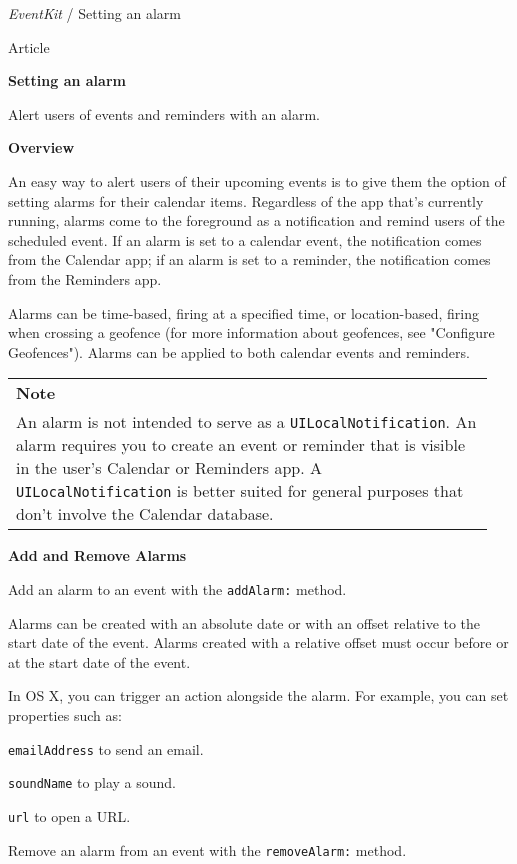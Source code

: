 \documentclass{article}
\title{}
\author{}
\date{}
\begin{document}
\noindent \textit{EventKit} / Setting an alarm

\noindent Article

\noindent \textbf{Setting an alarm}

\noindent Alert users of events and reminders with an alarm.

\noindent \textbf{Overview}

\noindent An easy way to alert users of their upcoming events is to give them the option of setting alarms for their calendar items. Regardless of the app that's currently running, alarms come to the foreground as a notification and remind users of the scheduled event. If an alarm is set to a calendar event, the notification comes from the Calendar app; if an alarm is set to a reminder, the notification comes from the Reminders app.

\noindent Alarms can be time-based, firing at a specified time, or location-based, firing when crossing a geofence (for more information about geofences, see "Configure Geofences"). Alarms can be applied to both calendar events and reminders.

\noindent
\begin{tabular}{|p{0.95\linewidth}|} \hline
\textbf{Note}\\
An alarm is not intended to serve as a \texttt{UILocalNotification}. An alarm requires you to create an event or reminder that is visible in the user's Calendar or Reminders app. A \texttt{UILocalNotification} is better suited for general purposes that don't involve the Calendar database. \\ \hline
\end{tabular}

\noindent \textbf{Add and Remove Alarms}

\noindent Add an alarm to an event with the \texttt{addAlarm:} method.

\noindent Alarms can be created with an absolute date or with an offset relative to the start date of the event. Alarms created with a relative offset must occur before or at the start date of the event.

\noindent In OS X, you can trigger an action alongside the alarm. For example, you can set properties such as:

\noindent \texttt{emailAddress} to send an email.

\noindent \texttt{soundName} to play a sound.

\noindent \texttt{url} to open a URL.

\noindent Remove an alarm from an event with the \texttt{removeAlarm:} method.
\end{document}
